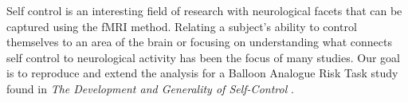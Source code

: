 \par Self control is an interesting field of research with neurological facets that can be captured using the fMRI method. Relating a subject’s ability to control themselves to an area of the brain or focusing on understanding what connects self control to neurological activity has been the focus of many studies. Our goal is to reproduce and extend the analysis for a Balloon Analogue Risk Task study found in \textit{The Development and Generality of Self-Control} \cite{../CohenSelfControl}.
